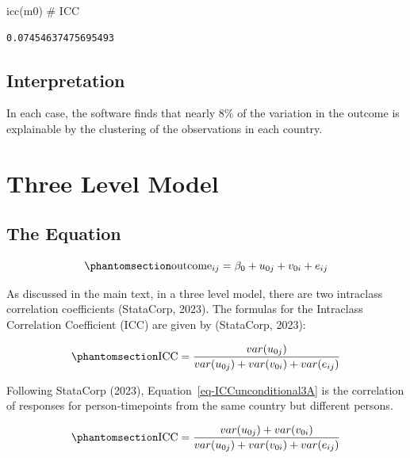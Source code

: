 \documentclass[
  letterpaper,
  DIV=11,
  numbers=noendperiod]{scrreprt}
\newenvironment{Shaded}{\begin{snugshade}}{\end{snugshade}}
\newcommand{\CommentTok}[1]{\textcolor[rgb]{0.37,0.37,0.37}{#1}}
\newcommand{\FunctionTok}[1]{\textcolor[rgb]{0.28,0.35,0.67}{#1}}
\newcommand{\NormalTok}[1]{\textcolor[rgb]{0.00,0.23,0.31}{#1}}
\begin{document}
\begin{Shaded}
\begin{Highlighting}[]

\FunctionTok{icc}\NormalTok{(m0) }\CommentTok{\# ICC}
\end{Highlighting}
\end{Shaded}

\begin{verbatim}
0.07454637475695493
\end{verbatim}

\subsection{Interpretation}\label{interpretation-1}

In each case, the software finds that nearly 8\% of the variation in the
outcome is explainable by the clustering of the observations in each
country.

\section{Three Level Model}\label{three-level-model}

\subsection{The Equation}\label{the-equation-1}

\begin{equation}\phantomsection\label{eq-MLMunconditional3}{\text{outcome}_{ij}= \beta_0 + u_{0j} + v_{0i} + e_{ij}}\end{equation}

As discussed in the main text, in a three level model, there are two
intraclass correlation coefficients (StataCorp, 2023). The formulas for
the Intraclass Correlation Coefficient (ICC) are given by (StataCorp,
2023):

\begin{equation}\phantomsection\label{eq-ICCunconditional3A}{\text{ICC} = \frac{var(u_{0j})}{var(u_{0j}) + var(v_{0i}) + var(e_{ij})}}\end{equation}

Following StataCorp (2023), Equation~\ref{eq-ICCunconditional3A} is the
correlation of responses for person-timepoints from the same country but
different persons.

\begin{equation}\phantomsection\label{eq-ICCunconditional3B}{\text{ICC} = \frac{var(u_{0j}) + var(v_{0i})}{var(u_{0j}) + var(v_{0i}) + var(e_{ij})}}\end{equation}
\end{document}
